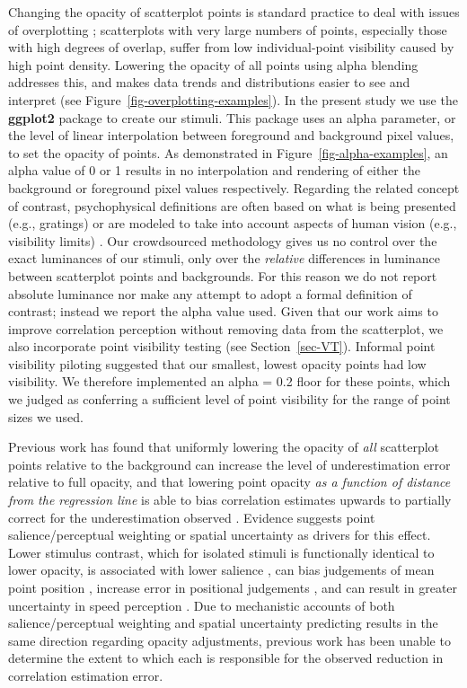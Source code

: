 \documentclass[sigconf]{acmart}
\begin{document}
Changing the opacity of scatterplot points is standard practice to deal
with issues of overplotting \citep{matejka_2015}; scatterplots with very
large numbers of points, especially those with high degrees of overlap,
suffer from low individual-point visibility caused by high point
density. Lowering the opacity of all points using alpha blending
\citep{few_2008} addresses this, and makes data trends and distributions
easier to see and interpret (see
Figure~\ref{fig-overplotting-examples}). In the present study we use the
\textbf{ggplot2} package \citep{hadley_gg2016} to create our stimuli.
This package uses an alpha parameter, or the level of linear
interpolation \citep{stone_2008} between foreground and background pixel
values, to set the opacity of points. As demonstrated in
Figure~\ref{fig-alpha-examples}, an alpha value of 0 or 1 results in no
interpolation and rendering of either the background or foreground pixel
values respectively. Regarding the related concept of contrast,
psychophysical definitions are often based on what is being presented
(e.g., gratings) or are modeled to take into account aspects of human
vision (e.g., visibility limits) \citep{zuffi_2007}. Our crowdsourced
methodology gives us no control over the exact luminances of our
stimuli, only over the \emph{relative} differences in luminance between
scatterplot points and backgrounds. For this reason we do not report
absolute luminance nor make any attempt to adopt a formal definition of
contrast; instead we report the alpha value used. Given that our work
aims to improve correlation perception without removing data from the
scatterplot, we also incorporate point visibility testing (see
Section~\ref{sec-VT}). Informal point visibility piloting suggested that
our smallest, lowest opacity points had low visibility. We therefore
implemented an alpha = 0.2 floor for these points, which we judged as
conferring a sufficient level of point visibility for the range of point
sizes we used.

Previous work has found that uniformly lowering the opacity of
\emph{all} scatterplot points relative to the background can increase
the level of underestimation error relative to full opacity, and that
lowering point opacity \emph{as a function of distance from the
regression line} is able to bias correlation estimates upwards to
partially correct for the underestimation observed \citep{strain_2023}.
Evidence suggests point salience/perceptual weighting or spatial
uncertainty as drivers for this effect. Lower stimulus contrast, which
for isolated stimuli is functionally identical to lower opacity, is
associated with lower salience \citep{healey_2011}, can bias judgements
of mean point position \citep{hong_2021}, increase error in positional
judgements \citep{wehrhahn_1990}, and can result in greater uncertainty
in speed perception \citep{champion_2017}. Due to mechanistic accounts
of both salience/perceptual weighting and spatial uncertainty predicting
results in the same direction regarding opacity adjustments, previous
work \citep{strain_2023} has been unable to determine the extent to
which each is responsible for the observed reduction in correlation
estimation error.
\end{document}
